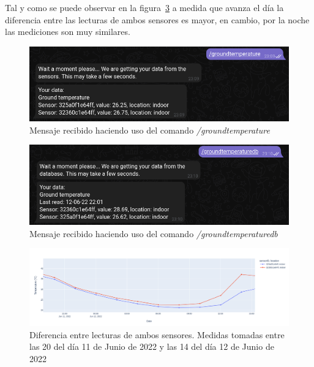 \documentclass[a4paper, 12pt, oneside]{book}
\begin{document}
Tal y como se puede observar en la figura~\ref{figura:ground_temperature_diferencias} a medida que avanza el día la diferencia entre las lecturas de ambos sensores es mayor, en cambio, por la noche las mediciones son muy similares.

\begin{figure}[H]
	\centering
    \includegraphics[width=12cm, keepaspectratio]{img/ground_temperature_telegram}
    \caption{Mensaje recibido haciendo uso del comando \textit{/groundtemperature}}
    \label{figura:ground_temperature_telegram}
\end{figure}
\begin{figure}[H]
	\centering
    \includegraphics[width=12cm, keepaspectratio]{img/ground_temperature_db_telegram}
    \caption{Mensaje recibido haciendo uso del comando \textit{/groundtemperaturedb}}
    \label{figura:ground_temperature_db_telegram}
\end{figure}

\begin{figure}[H]
	\centering
    \includegraphics[width=12cm, keepaspectratio]{img/ground_temperature_diferencias}
    \caption{Diferencia entre lecturas de ambos sensores. Medidas tomadas entre las 20 del día 11 de Junio de 2022 y las 14 del día 12 de Junio de 2022}
    \label{figura:ground_temperature_diferencias}
\end{figure}
\end{document}
